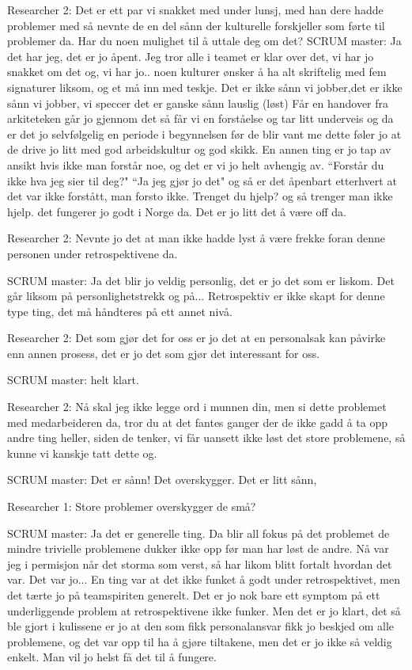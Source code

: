 \documentclass[12pt, a4paper]{report}
\begin{document}
Researcher 2: Det er ett par vi snakket med under lunsj, med han dere hadde problemer med så nevnte de en del sånn der kulturelle forskjeller som førte til problemer da. Har du noen mulighet til å uttale deg om det?
SCRUM master: Ja det har jeg, det er jo åpent. Jeg tror alle i teamet er klar over det, vi har jo snakket om det og, vi har jo.. noen kulturer ønsker å ha alt skriftelig med fem signaturer liksom, og et må inn med teskje. Det er ikke sånn vi jobber,det er ikke sånn vi jobber, vi speccer det er ganske sånn lauslig (løst) Får en handover fra arkiteteken går jo gjennom det så får vi en forståelse og tar litt underveis og da er det jo selvfølgelig en periode i begynnelsen før de blir vant me dette føler jo at de drive jo litt med god arbeidskultur og god skikk. En annen ting er jo tap av ansikt hvis ikke man forstår noe, og det er vi jo helt avhengig av. ``Forstår du ikke hva jeg sier til deg?" ``Ja jeg gjør jo det" og så er det åpenbart etterhvert at det var ikke forstått, man forsto ikke. Trenget du hjelp? og så trenger man ikke hjelp. det fungerer jo godt i Norge da. Det er jo litt det å være off da.

Researcher 2: Nevnte jo det at man ikke hadde lyst å være frekke foran denne personen under retrospektivene da.

SCRUM master: Ja det blir jo veldig personlig, det er jo det som er liskom. Det går liksom på personlighetstrekk og på... Retrospektiv er ikke skapt for denne type ting, det må håndteres på ett annet nivå.

Researcher 2: Det som gjør det for oss er jo det at en personalsak kan påvirke enn annen prosess, det er jo det som gjør det interessant for oss.

SCRUM master: helt klart.

Researcher 2: Nå skal jeg ikke legge ord i munnen din, men si dette problemet med medarbeideren da, tror du at det fantes ganger der de ikke gadd å ta opp andre ting heller, siden de tenker, vi får uansett ikke løst det store problemene, så kunne vi kanskje tatt dette og.

SCRUM master: Det er sånn! Det overskygger. Det er litt sånn,

Researcher 1: Store problemer overskygger de små?

SCRUM master: Ja det er generelle ting. Da blir all fokus på det problemet de mindre trivielle problemene dukker ikke opp før man har løst de andre. Nå var jeg i permisjon når det storma som verst, så har likom blitt fortalt hvordan det var. Det var jo... En ting var at det ikke funket å godt under retrospektivet, men det tærte jo på teamspiriten generelt. Det er jo nok bare ett symptom på ett underliggende problem at retrospektivene ikke funker. Men det er jo klart, det så ble gjort i kulissene er jo at den som fikk personalansvar fikk jo beskjed om alle problemene, og det var opp til ha å gjøre tiltakene, men det er jo ikke så veldig enkelt. Man vil jo helst få det til å fungere.
\end{document}
